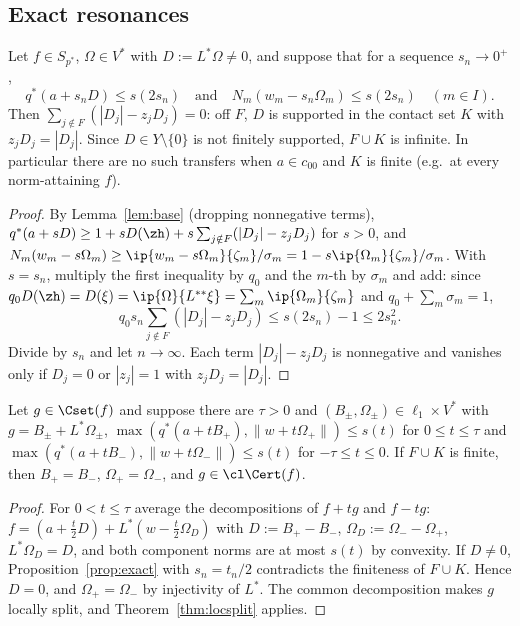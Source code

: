 \subsection{Exact resonances}

\begin{proposition}\label{prop:exact}
Let $f\in S_{p^*}$, $\Omega\in V^*$ with $D:=L^*\Omega\ne0$, and suppose that
for a sequence $s_n\to0^+$,
\[
 q^*(a+s_nD)\le s(2s_n)\quad\text{and}\quad N_m(w_m-s_n\Omega_m)\le s(2s_n)
 \quad(m\in I).
\]
Then $\sum_{j\notin F}(|D_j|-z_jD_j)=0$: off $F$, $D$ is supported in the
contact set $K$ with $z_jD_j=|D_j|$.  Since $D\in Y\setminus\{0\}$ is not
finitely supported, $F\cup K$ is infinite.  In particular there are no such
transfers when $a\in c_{00}$ and $K$ is finite \textup{(}e.g.\ at every
norm-attaining $f$\textup{)}.
\end{proposition}

\begin{proof}
By Lemma~\ref{lem:base} (dropping nonnegative terms),
$q^*(a+sD)\ge1+sD(\zh)+s\sum_{j\notin F}(|D_j|-z_jD_j)$ for $s>0$, and
$N_m(w_m-s\Omega_m)\ge\ip{w_m-s\Omega_m}{\zeta_m}/\sigma_m=1-s\ip{\Omega_m}
{\zeta_m}/\sigma_m$.  With $s=s_n$, multiply the first inequality by $q_0$
and the $m$-th by $\sigma_m$ and add: since $q_0D(\zh)=D(\xi)=\ip{\Omega}
{L^{**}\xi}=\sum_m\ip{\Omega_m}{\zeta_m}$ and $q_0+\sum_m\sigma_m=1$,
\[
 q_0s_n\sum_{j\notin F}(|D_j|-z_jD_j)\le s(2s_n)-1\le2s_n^2 .
\]
Divide by $s_n$ and let $n\to\infty$.  Each term $|D_j|-z_jD_j$ is
nonnegative and vanishes only if $D_j=0$ or $|z_j|=1$ with $z_jD_j=|D_j|$.
\end{proof}

\begin{corollary}\label{cor:twosided}
Let $g\in\Cset(f)$ and suppose there are $\tau>0$ and
$(B_\pm,\Omega_\pm)\in\ell_1\times V^*$ with $g=B_\pm+L^*\Omega_\pm$,
$\max(q^*(a+tB_+),\|w+t\Omega_+\|)\le s(t)$ for $0\le t\le\tau$ and
$\max(q^*(a+tB_-),\|w+t\Omega_-\|)\le s(t)$ for $-\tau\le t\le0$.  If
$F\cup K$ is finite, then $B_+=B_-$, $\Omega_+=\Omega_-$, and
$g\in\cl\Cert(f)$.
\end{corollary}

\begin{proof}
For $0<t\le\tau$ average the decompositions of $f+tg$ and $f-tg$:
$f=(a+\frac t2D)+L^*(w-\frac t2\Omega_D)$ with $D:=B_+-B_-$,
$\Omega_D:=\Omega_--\Omega_+$, $L^*\Omega_D=D$, and both component norms are
at most $s(t)$ by convexity.  If $D\ne0$, Proposition~\ref{prop:exact} with
$s_n=t_n/2$ contradicts the finiteness of $F\cup K$.  Hence $D=0$, and
$\Omega_+=\Omega_-$ by injectivity of $L^*$.  The common decomposition makes
$g$ locally split, and Theorem~\ref{thm:locsplit} applies.
\end{proof}

